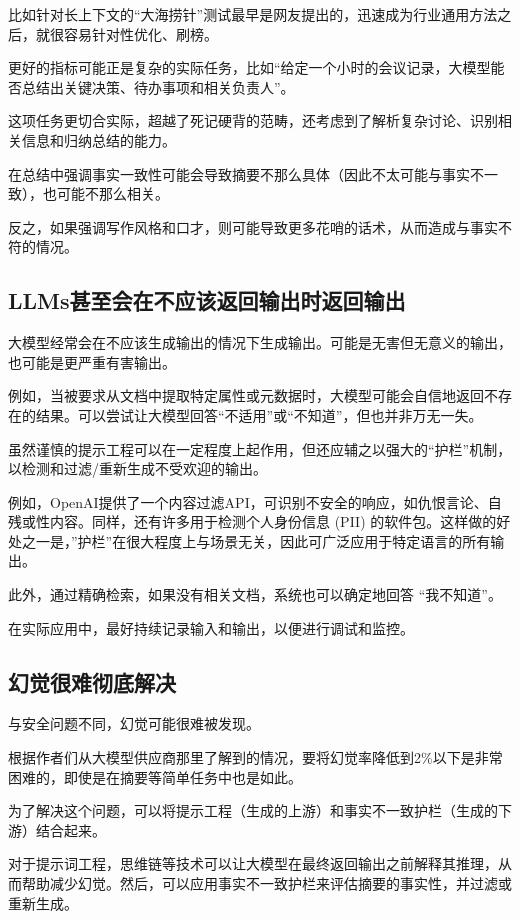 \documentclass[12pt]{book}
\begin{document}
比如针对长上下文的“大海捞针”测试最早是网友提出的，迅速成为行业通用方法之后，就很容易针对性优化、刷榜。

更好的指标可能正是复杂的实际任务，比如“给定一个小时的会议记录，大模型能否总结出关键决策、待办事项和相关负责人”。

这项任务更切合实际，超越了死记硬背的范畴，还考虑到了解析复杂讨论、识别相关信息和归纳总结的能力。

在总结中强调事实一致性可能会导致摘要不那么具体（因此不太可能与事实不一致），也可能不那么相关。

反之，如果强调写作风格和口才，则可能导致更多花哨的话术，从而造成与事实不符的情况。


\subsection{LLMs甚至会在不应该返回输出时返回输出}

大模型经常会在不应该生成输出的情况下生成输出。可能是无害但无意义的输出，也可能是更严重有害输出。

例如，当被要求从文档中提取特定属性或元数据时，大模型可能会自信地返回不存在的结果。可以尝试让大模型回答“不适用”或“不知道”，但也并非万无一失。

虽然谨慎的提示工程可以在一定程度上起作用，但还应辅之以强大的“护栏”机制，以检测和过滤/重新生成不受欢迎的输出。

例如，OpenAI提供了一个内容过滤API，可识别不安全的响应，如仇恨言论、自残或性内容。同样，还有许多用于检测个人身份信息 (PII) 的软件包。这样做的好处之一是，”护栏”在很大程度上与场景无关，因此可广泛应用于特定语言的所有输出。

此外，通过精确检索，如果没有相关文档，系统也可以确定地回答 “我不知道”。

在实际应用中，最好持续记录输入和输出，以便进行调试和监控。

\subsection{幻觉很难彻底解决}

与安全问题不同，幻觉可能很难被发现。

根据作者们从大模型供应商那里了解到的情况，要将幻觉率降低到2\%以下是非常困难的，即使是在摘要等简单任务中也是如此。

为了解决这个问题，可以将提示工程（生成的上游）和事实不一致护栏（生成的下游）结合起来。

对于提示词工程，思维链等技术可以让大模型在最终返回输出之前解释其推理，从而帮助减少幻觉。然后，可以应用事实不一致护栏来评估摘要的事实性，并过滤或重新生成。
\end{document}
